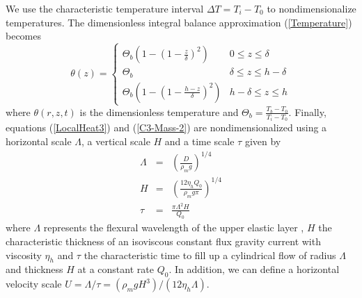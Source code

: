 We use the characteristic temperature interval $\Delta T = T_i-T_0$ to
nondimensionalize temperatures.  The dimensionless integral balance
approximation (\ref{Temperature}) becomes
\begin{equation}
  \theta(z)=
  \begin{cases}
    \Theta_b\left(1 -(1-\frac{z}{\delta})^2\right)& 0 \le z\le \delta \\
    \Theta_b & \delta \le z\le h-\delta \\
    \Theta_b\left(1-(1-\frac{h-z}{\delta})^2\right)  &   h-\delta  \le
    z\le h
  \end{cases}
  \label{Temperature2}
\end{equation}
where   $\theta(r,z,t)$   is   the   dimensionless   temperature   and
$\Theta_b=\frac{T_b-T_0}{T_{i}-T_0}$.        Finally,        equations
(\ref{LocalHeat3}) and (\ref{C3-Mass-2})  are nondimensionalized using
a horizontal  scale $\Lambda$, a vertical  scale $H$ and a  time scale
$\tau$ given by
\begin{eqnarray}
  \Lambda &=& \left(\frac{D}{\rho_m g}\right)^{1/4}\label{L1}\\
  H&=&\left       (\frac{12\eta_h      Q_{0}}{\rho_{m}g       \pi}\right      )
       ^{1/4} \label{H1}\\
  \tau&=&\frac{\pi \Lambda^{2} H}{Q_{0}}\label{T1}
\end{eqnarray}
where  $\Lambda$  represents  the  flexural wavelength  of  the  upper
elastic layer \citep{Michaut:2011kg}, $H$ the characteristic thickness
of an isoviscous constant flux gravity current with viscosity $\eta_h$
\citep{Huppert:1982wr} and $\tau$ the characteristic time to fill up a
cylindrical flow of  radius $\Lambda$ and thickness $H$  at a constant
rate $Q_0$.   In addition, we  can define a horizontal  velocity scale
$U=\Lambda/\tau=\left(\rho_m           g           H^3\right)/\left(12
  \eta_h\Lambda\right)$.

